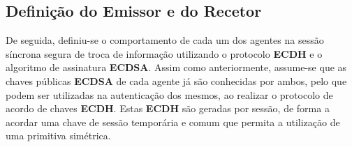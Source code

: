 \documentclass[11pt]{article}
\begin{document}
    \hypertarget{definiuxe7uxe3o-do-emissor-e-do-recetor}{%
\subsection{Definição do Emissor e do
Recetor}\label{definiuxe7uxe3o-do-emissor-e-do-recetor}}

    De seguida, definiu-se o comportamento de cada um dos agentes na
sessão síncrona segura de troca de informação utilizando o protocolo
\textbf{ECDH} e o algoritmo de assinatura \textbf{ECDSA}. Assim como anteriormente,
assume-se que as chaves públicas \textbf{ECDSA} de cada agente já são conhecidas por
ambos, pelo que podem ser utilizadas na autenticação dos mesmos, ao
realizar o protocolo de acordo de chaves \textbf{ECDH}. Estas
\textbf{ECDH} são geradas por sessão, de forma a acordar uma chave de
sessão temporária e comum que permita a utilização de uma primitiva
simétrica.
\end{document}

